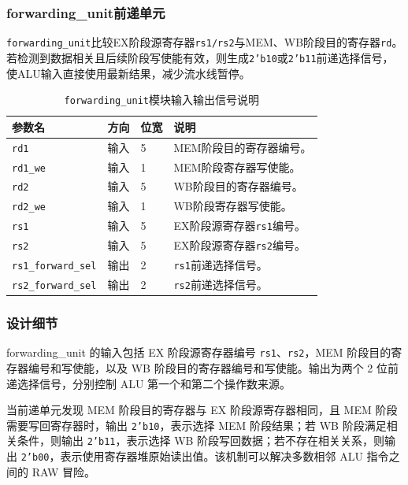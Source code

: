 \documentclass[12pt,a4paper]{ctexart}
\newcommand{\code}[1]{\texttt{#1}}
\begin{document}
\subsubsection{forwarding\_unit前递单元}

\code{forwarding\_unit}比较EX阶段源寄存器\code{rs1/rs2}与MEM、WB阶段目的寄存器\code{rd}。若检测到数据相关且后续阶段写使能有效，则生成\code{2'b10}或\code{2'b11}前递选择信号，使ALU输入直接使用最新结果，减少流水线暂停。

\begin{table}[H]
\centering
\caption{\code{forwarding\_unit}模块输入输出信号说明}
\footnotesize
\renewcommand{\arraystretch}{1.15}
\begin{tabularx}{\textwidth}{p{3.2cm}p{1.5cm}p{2.1cm}X}
\toprule
参数名 & 方向 & 位宽 & 说明 \\
\midrule
\code{rd1} & 输入 & 5 & MEM阶段目的寄存器编号。 \\
\code{rd1\_we} & 输入 & 1 & MEM阶段寄存器写使能。 \\
\code{rd2} & 输入 & 5 & WB阶段目的寄存器编号。 \\
\code{rd2\_we} & 输入 & 1 & WB阶段寄存器写使能。 \\
\code{rs1} & 输入 & 5 & EX阶段源寄存器\code{rs1}编号。 \\
\code{rs2} & 输入 & 5 & EX阶段源寄存器\code{rs2}编号。 \\
\code{rs1\_forward\_sel} & 输出 & 2 & \code{rs1}前递选择信号。 \\
\code{rs2\_forward\_sel} & 输出 & 2 & \code{rs2}前递选择信号。 \\
\bottomrule
\end{tabularx}
\end{table}

\subsubsection*{设计细节}

forwarding\_unit 的输入包括 EX 阶段源寄存器编号 \code{rs1}、\code{rs2}，MEM 阶段目的寄存器编号和写使能，以及 WB 阶段目的寄存器编号和写使能。输出为两个 2 位前递选择信号，分别控制 ALU 第一个和第二个操作数来源。

当前递单元发现 MEM 阶段目的寄存器与 EX 阶段源寄存器相同，且 MEM 阶段需要写回寄存器时，输出 \code{2'b10}，表示选择 MEM 阶段结果；若 WB 阶段满足相关条件，则输出 \code{2'b11}，表示选择 WB 阶段写回数据；若不存在相关关系，则输出 \code{2'b00}，表示使用寄存器堆原始读出值。该机制可以解决多数相邻 ALU 指令之间的 RAW 冒险。
\end{document}
